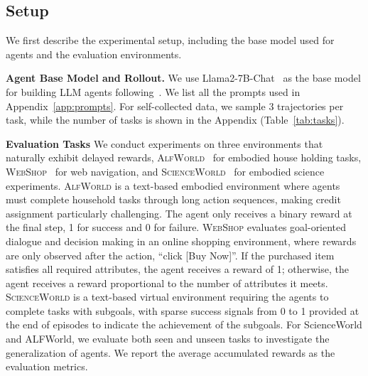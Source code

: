 \documentclass{article}
\theoremstyle{plain}
\theoremstyle{definition}
\theoremstyle{remark}
\begin{document}
\subsection{Setup}

We first describe the experimental setup, including the base model used for agents and the evaluation environments. 

\textbf{Agent Base Model and Rollout.}  We use Llama2-7B-Chat~\citep{touvron2023llama2openfoundation} as the base model for building LLM agents following~\citet{song2024trial,lin2025qlass}. 
We list all the prompts used in Appendix~\ref{app:prompts}. For self-collected data, we sample $3$ trajectories per task, while the number of tasks is shown in the Appendix (Table~\ref{tab:tasks}).

\textbf{Evaluation Tasks} We conduct experiments on three environments that naturally exhibit delayed rewards, \textsc{AlfWorld}~\citep{alfworld} for embodied house holding tasks, \textsc{WebShop}~\citep{WebShop} for web navigation, and \textsc{ScienceWorld}~\citep{scienceworld} for embodied science experiments. 
\textsc{AlfWorld} is a text-based embodied environment where agents must complete household tasks through long action sequences, making credit assignment particularly challenging. The agent only receives a binary reward at the final step, 1 for success and 0 for failure.
\textsc{WebShop} evaluates goal-oriented dialogue and decision making in an online shopping environment, where rewards are only observed after the action, ``click [Buy Now]''. If the purchased item satisfies all required attributes, the agent receives a reward of 1; otherwise, the agent receives a reward proportional to the number of attributes it meets. 
\textsc{ScienceWorld} is a text-based virtual environment requiring the agents to complete tasks with subgoals, with sparse success signals from 0 to 1 provided at the end of episodes to indicate the achievement of the subgoals. For ScienceWorld and ALFWorld, we evaluate both seen and unseen tasks to investigate the generalization of agents.   We report the average accumulated rewards as the evaluation metrics.


\end{document}
